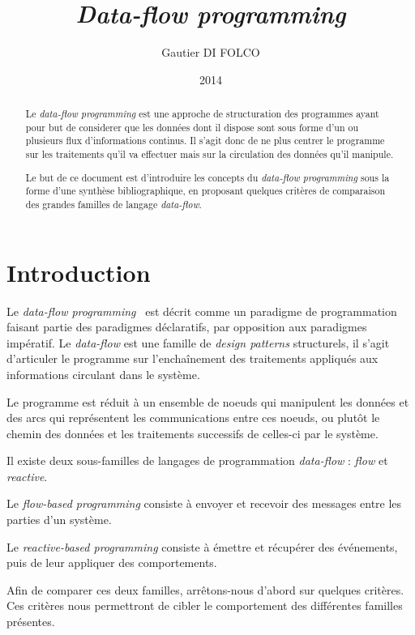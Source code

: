 \documentclass{article}
\title{\emph{Data-flow programming}}
\author{Gautier DI FOLCO}
\date{2014}
\begin{document}
\maketitle
\tableofcontents

\begin{abstract}
Le \emph{data-flow programming} est une approche de structuration des programmes
ayant pour but de considerer que les données dont il dispose sont sous forme
d'un ou plusieurs flux d'informations continus.
Il s'agit donc de ne plus centrer le programme sur les traitements qu'il va
effectuer mais sur la circulation des données qu'il manipule.

Le but de ce document est d'introduire les concepts du \emph{data-flow programming}
sous la forme d'une synthèse bibliographique, en proposant quelques critères de
comparaison des grandes familles de langage \emph{data-flow}.
\end{abstract}

\section{Introduction}\label{introduction}

Le \emph{data-flow programming}~\cite{dataflow} est décrit comme un paradigme de
programmation faisant partie des paradigmes déclaratifs, par opposition
aux paradigmes impératif.
Le \emph{data-flow} est une famille de \emph{design patterns} structurels,
il s'agit d'articuler le programme sur l'enchaînement des
traitements appliqués aux informations circulant dans le système.

Le programme est réduit à un ensemble de noeuds qui
manipulent les données et des arcs qui représentent les
communications entre ces noeuds, ou plutôt le chemin des
données et les traitements successifs de celles-ci par le système.

Il existe deux sous-familles de langages de programmation \emph{data-flow} :
\emph{flow} et \emph{reactive}.

Le \emph{flow-based programming} consiste à envoyer et recevoir des messages entre
les parties d'un système.

Le \emph{reactive-based programming} consiste à émettre et récupérer des événements,
puis de leur appliquer des comportements.

Afin de comparer ces deux familles, arrêtons-nous d'abord sur quelques critères.
Ces critères nous permettront de cibler le comportement des différentes familles présentes.
\end{document}
